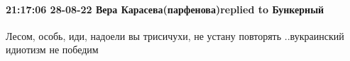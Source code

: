 
 
 
 
 

\paragraph{21:17:06 28-08-22 Вера Карасева(парфенова)replied to Бункерный}

Лесом, особь, иди, надоели вы трисичухи, не устану повторять ..вукраинский
идиотизм не победим
